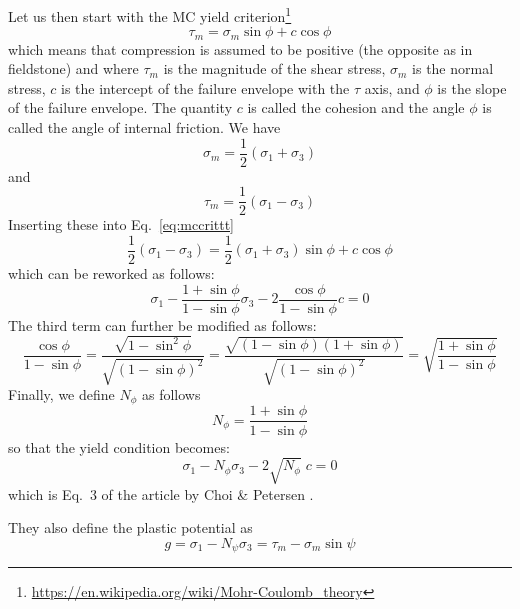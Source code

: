 Let us then start with the MC yield criterion\footnote{\url{https://en.wikipedia.org/wiki/Mohr-Coulomb_theory}}
\begin{equation}
\tau_m = \sigma_m \sin \phi + c \cos \phi  \label{eq:mccrittt}
\end{equation}
which means that compression is assumed to be positive (the opposite as in fieldstone) and where $\tau_m$ is the magnitude of the shear stress, 
$\sigma_m$ is the normal stress, $c$ is the intercept of the failure envelope with the $\tau$ axis, 
and $\phi$ is the slope of the failure envelope. 
The quantity $c$ is called the cohesion and the angle $\phi$ is called the angle of internal friction.
We have
\[
\sigma_m=\frac{1}{2}(\sigma_1+\sigma_3) 
\]
and 
\[
\tau_m = \frac{1}{2}(\sigma_1-\sigma_3)
\]
Inserting these into Eq.~\eqref{eq:mccrittt}
\begin{equation}
 \frac{1}{2}(\sigma_1-\sigma_3) = \frac{1}{2}(\sigma_1+\sigma_3)  \sin \phi + c \cos \phi 
\end{equation}
which can be reworked as follows:
\[
\sigma_1 - \frac{1 + \sin\phi}{1-\sin\phi} \sigma_3 - 2 \frac{\cos \phi}{1-\sin\phi} c = 0
\]
The third term can further be modified as follows:
\[
\frac{\cos \phi}{1-\sin\phi}
=\frac{\sqrt{1-\sin^2 \phi}}{\sqrt{(1-\sin\phi)^2}}
=\frac{\sqrt{(1-\sin \phi)(1+\sin\phi)}}{\sqrt{(1-\sin\phi)^2}}
=\sqrt{
\frac{1+\sin\phi}{1-\sin\phi}
}
\]
Finally, we define $N_\phi$ as follows 
\[
N_\phi=\frac{1+\sin \phi}{1-\sin\phi}
\]
so that the yield condition becomes:
\[
\sigma_1 - N_\phi \sigma_3 - 2 \sqrt{N_\phi} \; c = 0
\]
which is Eq.~3 of the article by Choi \& Petersen \cite{chpe15}.

They also define the plastic potential as 
\[
g=\sigma_1 -N_\psi \sigma_3  =\tau_m - \sigma_m \sin\psi
\]


